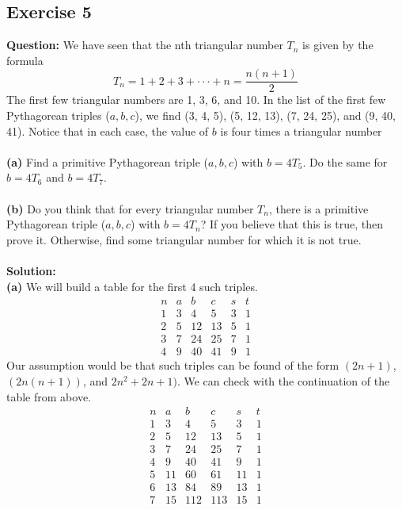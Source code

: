 \documentclass{article}
\begin{document}
\subsection{Exercise 5}
\textbf{Question:} We have seen that the nth triangular number $T_n$ is given by the formula
\begin{equation*}
T_n = 1+2+3+\cdot\cdot\cdot+n=\dfrac{n(n+1)}{2}
\end{equation*}
The first few triangular numbers are 1, 3, 6, and 10. In the list of the first few Pythagorean triples ($a, b, c$), we find (3, 4, 5), (5, 12, 13), (7, 24, 25), and (9, 40, 41). Notice that in each case, the value of $b$ is four times a triangular number\\
\\\textbf{(a)} Find a primitive Pythagorean triple ($a,b,c$) with $b = 4T_{5}$. Do the same for $b = 4T_{6}$ and $b = 4T_{7}$.\\
\\\textbf{(b)} Do you think that for every triangular number $T_{n}$, there is a primitive Pythagorean triple ($a,b,c$) with $b = 4T_{n}$? If you believe that this is true, then prove it. Otherwise, find some triangular number for which it is not true.\\
\\\textbf{Solution:}\\ 
\textbf{(a)} We will build a table for the first 4 such triples.
\begin{displaymath}
\begin{array}{c|c|c|c|c|c}
n & a & b & c & s & t\\
\hline
1 & 3 & 4 & 5 & 3 & 1\\
2 & 5 & 12 & 13 & 5 & 1\\
3 & 7 & 24 & 25 & 7 & 1\\
4 & 9 & 40 & 41 & 9 & 1
\end{array}
\end{displaymath}
Our assumption would be that such triples can be found of the form $(2n+1)$, $(2n(n+1))$, and $2n^{2}+2n+1)$. We can check with the continuation of the table from above.
\begin{displaymath}
\begin{array}{c|c|c|c|c|c}
n & a & b & c & s & t\\
\hline
1 & 3 & 4 & 5 & 3 & 1\\
2 & 5 & 12 & 13 & 5 & 1\\
3 & 7 & 24 & 25 & 7 & 1\\
4 & 9 & 40 & 41 & 9 & 1\\
5 & 11 & 60 & 61 & 11 & 1\\
6 & 13 & 84 & 89 & 13 & 1\\
7 & 15 & 112 & 113 & 15 & 1
\end{array}
\end{displaymath}
\end{document}
